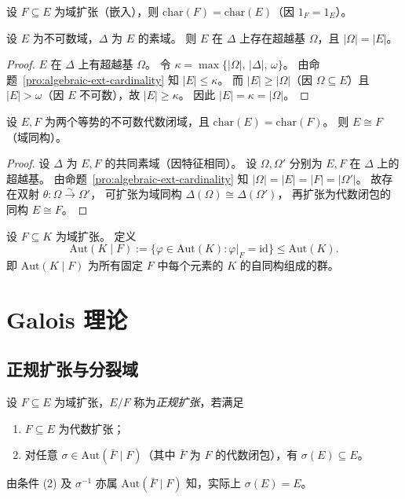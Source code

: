 \documentclass[lang=cn,a4paper,newtx]{elegantbook}
\begin{document}
\begin{remark}
  设 $F\subseteq E$ 为域扩张（嵌入），则 $\mathrm{char}(F)=\mathrm{char}(E)$（因 $1_F=1_E$）。
\end{remark}

\begin{proposition}
  设 $E$ 为不可数域，$\Delta$ 为 $E$ 的素域。
  则 $E$ 在 $\Delta$ 上存在超越基 $\Omega$，且 $|\Omega|=|E|$。
\end{proposition}

\begin{proof}
  $E$ 在 $\Delta$ 上有超越基 $\Omega$。
  令 $\kappa=\max\{|\Omega|,\,|\Delta|,\,\omega\}$。
  由命题~\ref{pro:algebraic-ext-cardinality} 知 $|E|\le\kappa$。
  而 $|E|\ge|\Omega|$（因 $\Omega\subseteq E$）且 $|E|>\omega$（因 $E$ 不可数），故 $|E|\ge\kappa$。
  因此 $|E|=\kappa=|\Omega|$。
\end{proof}

\begin{theorem}
  设 $E,F$ 为两个等势的不可数代数闭域，且 $\mathrm{char}(E)=\mathrm{char}(F)$。
  则 $E\cong F$（域同构）。
\end{theorem}

\begin{proof}
  设 $\Delta$ 为 $E,F$ 的共同素域（因特征相同）。
  设 $\Omega,\Omega'$ 分别为 $E,F$ 在 $\Delta$ 上的超越基。
  由命题~\ref{pro:algebraic-ext-cardinality} 知 $|\Omega|=|E|=|F|=|\Omega'|$。
  故存在双射 $\theta\colon\Omega\xrightarrow{\sim}\Omega'$，
  可扩张为域同构 $\Delta(\Omega)\cong\Delta(\Omega')$，
  再扩张为代数闭包的同构 $E\cong F$。
\end{proof}

\begin{definition}[自同构群]
  设 $F\subseteq K$ 为域扩张。
  定义
  \[
    \mathrm{Aut}(K\mid F):=\bigl\{\varphi\in\mathrm{Aut}(K):\varphi\big|_F=\mathrm{id}\bigr\}\le\mathrm{Aut}(K).
  \]
  即 $\mathrm{Aut}(K\mid F)$ 为所有固定 $F$ 中每个元素的 $K$ 的自同构组成的群。
\end{definition}

\chapter{Galois 理论}

\section{正规扩张与分裂域}

\begin{definition}[正规扩张]
  设 $F\subseteq E$ 为域扩张，$E/F$ 称为\emph{正规扩张}，若满足
  \begin{enumerate}
    \item $F\subseteq E$ 为代数扩张；
    \item 对任意 $\sigma\in\mathrm{Aut}(\bar F\mid F)$（其中 $\bar F$ 为 $F$ 的代数闭包），有 $\sigma(E)\subseteq E$。
  \end{enumerate}
  由条件 (2) 及 $\sigma^{-1}$ 亦属 $\mathrm{Aut}(\bar F\mid F)$ 知，实际上 $\sigma(E)=E$。
\end{definition}
\end{document}
